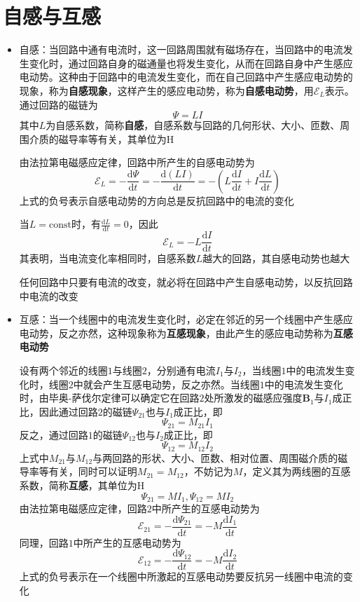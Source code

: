 \documentclass[12pt, a4paper, twoside]{ctexbook}
\begin{document}
\section{自感与互感}
\begin{itemize}
    \item {\sonti 自感}：当回路中通有电流时，这一回路周围就有磁场存在，当回路中的电流发生变化时，通过回路自身的磁通量也将发生变化，从而在回路自身中产生感应电动势。这种由于回路中的电流发生变化，而在自己回路中产生感应电动势的现象，称为\textbf{自感现象}，这样产生的感应电动势，称为\textbf{自感电动势}，用$\mathscr{E}_L$表示。通过回路的磁链为
    $$
    \varPsi=LI
    $$
    其中$L$为自感系数，简称\textbf{自感}，自感系数与回路的几何形状、大小、匝数、周围介质的磁导率等有关，其单位为$\mathrm{H}$

    由法拉第电磁感应定律，回路中所产生的自感电动势为
    $$
    \mathscr{E}_L=-\frac{\mathrm{d}\varPsi}{\mathrm{d}t}=-\frac{\mathrm{d}\left(LI\right)}{\mathrm{d}t}=-\left(L\frac{\mathrm{d}I}{\mathrm{d}t}+I\frac{\mathrm{d}L}{\mathrm{d}t}\right)
    $$
    上式的负号表示自感电动势的方向总是反抗回路中的电流的变化

    当$L=\mathrm{const}$时，有$\frac{\mathrm{d}L}{\mathrm{d}t}=0$，因此
    $$
    \mathscr{E}_L=-L\frac{\mathrm{d}I}{\mathrm{d}t}
    $$
    其表明，当电流变化率相同时，自感系数$L$越大的回路，其自感电动势也越大

    任何回路中只要有电流的改变，就必将在回路中产生自感电动势，以反抗回路中电流的改变
    \item {\sonti 互感}：当一个线圈中的电流发生变化时，必定在邻近的另一个线圈中产生感应电动势，反之亦然，这种现象称为\textbf{互感现象}，由此产生的感应电动势称为\textbf{互感电动势}
    
    设有两个邻近的线圈$1$与线圈$2$，分别通有电流$I_1$与$I_2$，当线圈$1$中的电流发生变化时，线圈$2$中就会产生互感电动势，反之亦然。当线圈$1$中的电流发生变化时，由毕奥-萨伐尔定律可以确定它在回路$2$处所激发的磁感应强度$\boldsymbol{B}_1$与$I_1$成正比，因此通过回路$2$的磁链$\varPsi_{21}$也与$I_1$成正比，即
    $$
    \varPsi_{21}=M_{21}I_1
    $$
    反之，通过回路$1$的磁链$\varPsi_{12}$也与$I_2$成正比，即
    $$
    \varPsi_{12}=M_{12}I_2
    $$
    上式中$M_{21}$与$M_{12}$与两回路的形状、大小、匝数、相对位置、周围磁介质的磁导率等有关，同时可以证明$M_{21}=M_{12}$，不妨记为$M$，定义其为两线圈的互感系数，简称\textbf{互感}，其单位为$\mathrm{H}$
    $$
    \varPsi_{21}=MI_1,\varPsi_{12}=MI_2
    $$
    由法拉第电磁感应定律，回路$2$中所产生的互感电动势为
    $$
    \mathscr{E}_{21}=-\frac{\mathrm{d}\varPsi_{21}}{\mathrm{d}t}=-M\frac{\mathrm{d}I_1}{\mathrm{d}t}
    $$
    同理，回路$1$中所产生的互感电动势为
    $$
    \mathscr{E}_{12}=-\frac{\mathrm{d}\varPsi_{12}}{\mathrm{d}t}=-M\frac{\mathrm{d}I_2}{\mathrm{d}t}
    $$
    上式的负号表示在一个线圈中所激起的互感电动势要反抗另一线圈中电流的变化
\end{itemize}
\end{document}
